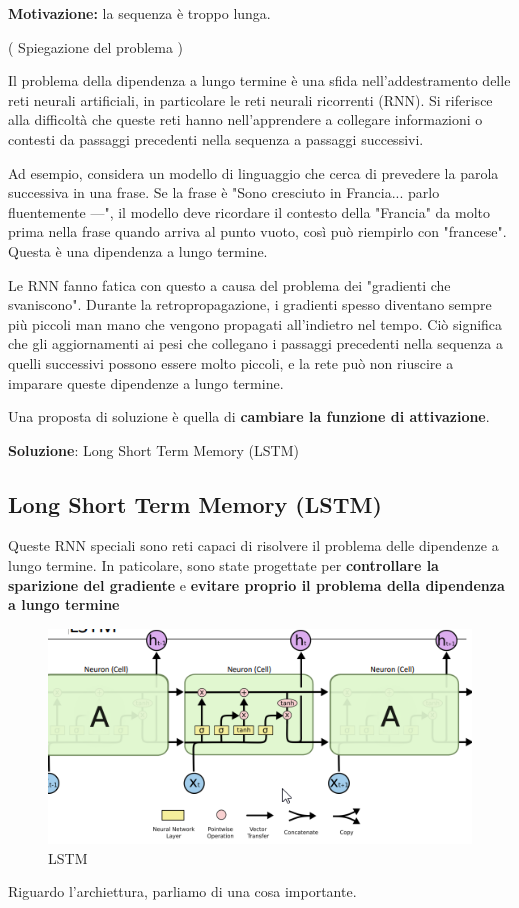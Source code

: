 \textbf{Motivazione:} la sequenza è troppo lunga.
\begin{definition}(
    Spiegazione del problema )

    Il problema della dipendenza a lungo termine è una sfida nell'addestramento
    delle reti neurali artificiali, in particolare le reti neurali ricorrenti
    (RNN). Si riferisce alla difficoltà che queste reti hanno nell'apprendere a
    collegare informazioni o contesti da passaggi precedenti nella sequenza a
    passaggi successivi.

    Ad esempio, considera un modello di linguaggio che cerca di prevedere la parola
    successiva in una frase. Se la frase è "Sono cresciuto in Francia... parlo
    fluentemente ---", il modello deve ricordare il contesto della "Francia" da
    molto prima nella frase quando arriva al punto vuoto, così può riempirlo con
    "francese". Questa è una dipendenza a lungo termine.

    Le RNN fanno fatica con questo a causa del problema dei "gradienti che
    svaniscono". Durante la retropropagazione, i gradienti spesso diventano sempre
    più piccoli man mano che vengono propagati all'indietro nel tempo. Ciò
    significa che gli aggiornamenti ai pesi che collegano i passaggi precedenti
    nella sequenza a quelli successivi possono essere molto piccoli, e la rete può
    non riuscire a imparare queste dipendenze a lungo termine.
\end{definition}

Una proposta di soluzione è quella di \textbf{cambiare la funzione di
    attivazione}.

\textbf{Soluzione}: Long Short Term Memory (LSTM)

\subsection{Long Short Term Memory (LSTM)}

Queste RNN speciali sono reti capaci di risolvere il problema delle dipendenze
a lungo termine. In paticolare, sono state progettate per \textbf{controllare
    la sparizione del gradiente} e \textbf{evitare proprio il problema della
    dipendenza a lungo termine}

\begin{figure}
    \begin{center}
        \includegraphics[scale=0.8]{images/LSTM.png}
    \end{center}
    \caption{LSTM}
\end{figure}
Riguardo l'archiettura, parliamo di una cosa importante.

